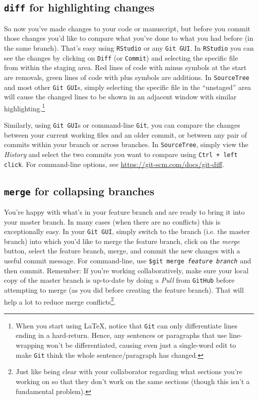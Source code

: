 \documentclass[12pt,letterpaper]{article}
\begin{document}
\subsection{\texttt{diff} for highlighting changes}
So now you've made changes to your code or manuscript, but before you commit those changes you'd like to compare what you've done to what you had before (in the same branch).
That's easy using \texttt{RStudio} or any \texttt{Git GUI}.
In \texttt{RStudio} you can see the changes by clicking on \texttt{Diff} (or \texttt{Commit}) and selecting the specific file from within the staging area.
Red lines of code with minus symbols at the start are removals, green lines of code with plus symbols are additions.
In \texttt{SourceTree} and most other \texttt{Git GUI}s, simply selecting the specific file in the ``unstaged'' area will cause the changed lines to be shown in an adjacent window with similar highlighting.\footnote{When you start using \LaTeX, notice that \texttt{Git} can only differentiate lines ending in a hard-return.
Hence, any sentences or paragraphs that use line-wrapping won't be differentiated, causing even just a single-word edit to make \texttt{Git} think the whole sentence/paragraph has changed.}

Similarly, using \texttt{Git GUI}s or command-line \texttt{Git}, you can compare the changes between your current working files and an older commit, or between any pair of commits within your branch or across branches.
In \texttt{SourceTree}, simply view the \emph{History} and select the two commits you want to compare using \texttt{Ctrl + left click}.
For command-line options, see \url{https://git-scm.com/docs/git-diff}.


\subsection{\texttt{merge} for collapsing branches}

You're happy with what's in your feature branch and are ready to bring it into your master branch.
In many cases (when there are no conflicts) this is exceptionally easy.
In your \texttt{Git GUI}, simply switch to the branch (i.e. the master branch) into which you'd like to merge the feature branch, click on the \emph{merge} button, select the feature branch, merge, and commit the new changes with a useful commit message.
For command-line, use \texttt{\$git merge \emph{feature branch}} and then commit.
Remember:  If you're working collaboratively, make sure your local copy of the master branch is up-to-date by doing a \emph{Pull} from \texttt{GitHub} before attempting to merge (as you did before creating the feature branch).
That will help a lot to reduce merge conflicts\footnote{Just like being clear with your collaborator regarding what sections you're working on so that they don't work on the same sections (though this isn't a fundamental problem).}.
\end{document}
